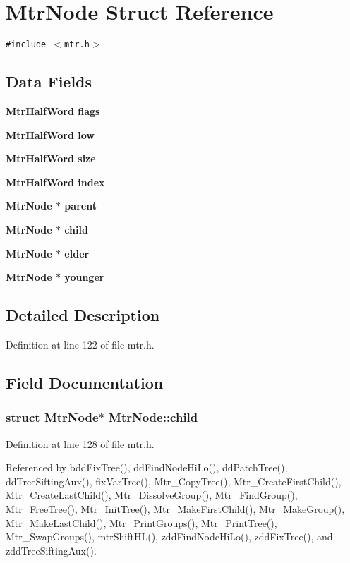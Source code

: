 \section{Mtr\-Node Struct Reference}
\label{structMtrNode}
{\tt \#include $<$mtr.h$>$}

\subsection*{Data Fields}
\begin{CompactItemize}
\item 
\bf{Mtr\-Half\-Word} \bf{flags}
\item 
\bf{Mtr\-Half\-Word} \bf{low}
\item 
\bf{Mtr\-Half\-Word} \bf{size}
\item 
\bf{Mtr\-Half\-Word} \bf{index}
\item 
\bf{Mtr\-Node} $\ast$ \bf{parent}
\item 
\bf{Mtr\-Node} $\ast$ \bf{child}
\item 
\bf{Mtr\-Node} $\ast$ \bf{elder}
\item 
\bf{Mtr\-Node} $\ast$ \bf{younger}
\end{CompactItemize}


\subsection{Detailed Description}




Definition at line 122 of file mtr.h.

\subsection{Field Documentation}
\subsubsection{\setlength{\rightskip}{0pt plus 5cm}struct \bf{Mtr\-Node}$\ast$ \bf{Mtr\-Node::child}}\label{structMtrNode_a5cced262e32e3b5c0f01277dbad6db0}




Definition at line 128 of file mtr.h.

Referenced by bdd\-Fix\-Tree(), dd\-Find\-Node\-Hi\-Lo(), dd\-Patch\-Tree(), dd\-Tree\-Sifting\-Aux(), fix\-Var\-Tree(), Mtr\_\-Copy\-Tree(), Mtr\_\-Create\-First\-Child(), Mtr\_\-Create\-Last\-Child(), Mtr\_\-Dissolve\-Group(), Mtr\_\-Find\-Group(), Mtr\_\-Free\-Tree(), Mtr\_\-Init\-Tree(), Mtr\_\-Make\-First\-Child(), Mtr\_\-Make\-Group(), Mtr\_\-Make\-Last\-Child(), Mtr\_\-Print\-Groups(), Mtr\_\-Print\-Tree(), Mtr\_\-Swap\-Groups(), mtr\-Shift\-HL(), zdd\-Find\-Node\-Hi\-Lo(), zdd\-Fix\-Tree(), and zdd\-Tree\-Sifting\-Aux().
